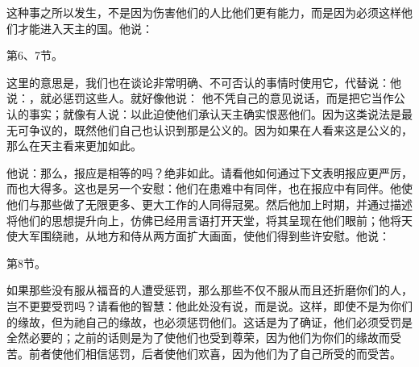 \par

这种事之所以发生，不是因为伤害他们的人比他们更有能力，而是因为必须这样他们才能进入天主的国。他说：\newline{}\par

第6、7节。\par

这里的意思是，我们也在谈论非常明确、不可否认的事情时使用它，代替说：他说：，就必惩罚这些人。就好像他说： 他不凭自己的意见说话，而是把它当作公认的事实；就像有人说：以此迫使他们承认天主确实恨恶他们。因为这类说法是最无可争议的，既然他们自己也认识到那是公义的。因为如果在人看来这是公义的，那么在天主看来更加如此。\par

他说：那么，报应是相等的吗？绝非如此。请看他如何通过下文表明报应更严厉，而也大得多。这也是另一个安慰：他们在患难中有同伴，也在报应中有同伴。他使他们与那些做了无限更多、更大工作的人同得冠冕。然后他加上时期，并通过描述将他们的思想提升向上，仿佛已经用言语打开天堂，将其呈现在他们眼前；他将天使大军围绕祂，从地方和侍从两方面扩大画面，使他们得到些许安慰。他说：\par

第8节。\newline{}\par

如果那些没有服从福音的人遭受惩罚，那么那些不仅不服从而且还折磨你们的人，岂不更要受罚吗？请看他的智慧：他此处没有说，而是说。这样，即使不是为你们的缘故，但为祂自己的缘故，也必须惩罚他们。这话是为了确证，他们必须受罚是全然必要的；之前的话则是为了使他们也受到尊荣，因为他们为你们的缘故而受苦。前者使他们相信惩罚，后者使他们欢喜，因为他们为了自己所受的而受苦。\par

